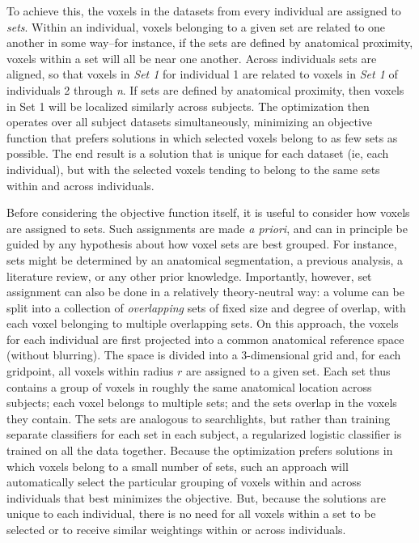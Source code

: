 To achieve this, the voxels in the datasets from every individual are assigned to {\em sets}. Within an individual, voxels belonging to a given set are related to one another in some way--for instance, if the sets are defined by anatomical proximity, voxels within a set will all be near one another. Across individuals sets are aligned, so that voxels in {\em Set 1} for individual 1 are related to voxels in {\em Set 1} of individuals 2 through {\em n}. If sets are defined by anatomical proximity, then voxels in Set 1 will be localized similarly across subjects. The optimization then operates over all subject datasets simultaneously, minimizing an objective function that prefers solutions in which selected voxels belong to as few sets as possible. The end result is a solution that is unique for each dataset (ie, each individual), but with the selected voxels tending to belong to the same sets within and across individuals. 

Before considering the objective function itself, it is useful to consider how voxels are assigned to sets. Such assignments are made {\em a priori}, and can in principle be guided by any hypothesis about how voxel sets are best grouped. For instance, sets might be determined by an anatomical segmentation, a previous analysis, a literature review, or any other prior knowledge. Importantly, however, set assignment can also be done in a relatively theory-neutral way: a volume can be split into a collection of {\em overlapping} sets of fixed size and degree of overlap, with each voxel belonging to multiple overlapping sets. On this approach, the voxels for each individual are first projected into a common anatomical reference space (without blurring). The space is divided into a 3-dimensional grid and, for each gridpoint, all voxels within radius $r$ are assigned to a given set. Each set thus contains a group of voxels in roughly the same anatomical location across subjects; each voxel belongs to multiple sets; and the sets overlap in the voxels they contain. The sets are analogous to searchlights, but rather than training separate classifiers for each set in each subject, a regularized logistic classifier is trained on all the data together. Because the optimization prefers solutions in which voxels belong to a small number of sets, such an approach will automatically select the particular grouping of voxels within and across individuals that best minimizes the objective. But, because the solutions are unique to each individual, there is no need for all voxels within a set to be selected or to receive similar weightings within or across individuals.


